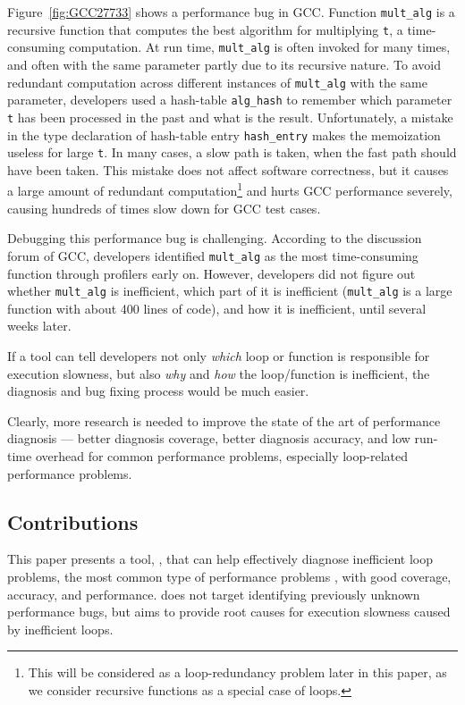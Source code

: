 Figure~\ref{fig:GCC27733} shows a performance bug in GCC. 
Function \texttt{mult\_alg} is a recursive function 
that computes the best algorithm for 
multiplying \texttt{t}, a time-consuming computation. 
At run time, \texttt{mult\_alg} is often invoked for many times, and often
with the same parameter partly due to its recursive nature.
To avoid redundant computation across different instances of
\texttt{mult\_alg} with the same parameter, developers used a
hash-table
\texttt{alg\_hash} to remember which parameter \texttt{t} has been processed
in the past and what is the result. 
Unfortunately, a mistake in the type declaration of hash-table
entry \texttt{hash\_entry} makes the memoization useless for large \texttt{t}.
In many cases, a slow path is taken, when the fast path should have been taken.
This mistake does not affect software correctness, but it causes a large amount
of redundant computation\footnote{This will be considered as a
loop-redundancy problem later in this paper, as we consider
recursive functions as a special case of loops.} 
and hurts GCC performance severely,
causing hundreds of times slow down for GCC test cases.

Debugging this performance bug is challenging. According to 
the discussion forum of GCC, developers identified
\texttt{mult\_alg} as the most time-consuming function
through profilers early on. However, developers did not figure out 
whether \texttt{mult\_alg} is inefficient, which part of it is 
inefficient (\texttt{mult\_alg} is a large function with about 400 lines of 
code), and how it is inefficient, until several weeks later.

If a tool can tell developers not only \emph{which} loop or function is
responsible for execution slowness, but also \emph{why} and \emph{how}
the loop/function is inefficient, 
the diagnosis and bug fixing
process would be much easier. 

Clearly, more research is needed to improve the state of the art of performance
diagnosis --- better diagnosis
coverage, better diagnosis accuracy, and low run-time
overhead for common performance problems,
especially loop-related performance problems.


\subsection{Contributions}
This paper presents a tool, \Tool, that can help effectively diagnose
inefficient loop problems, the most common type of performance problems
\cite{SongOOPSLA2014,PerfBug}, with good coverage, accuracy, and performance.
{\color{red} \Tool does not target identifying previously unknown performance bugs, 
but aims to provide root causes for execution slowness caused by inefficient loops.}


